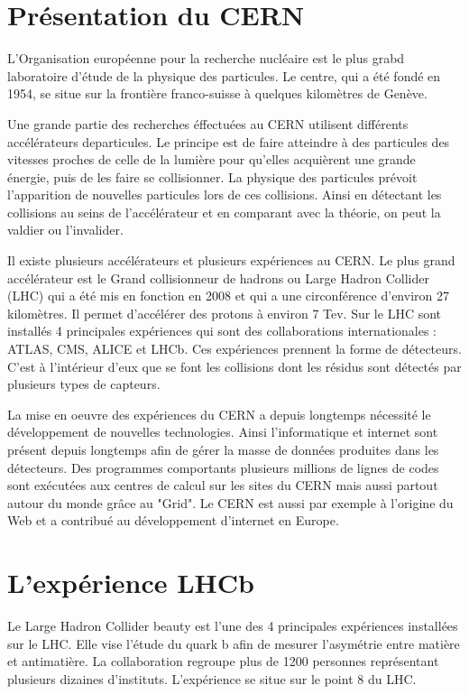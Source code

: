 \documentclass[a4paper,12pt]{report}
\begin{document}
    \section{Présentation du CERN}
    L'Organisation européenne pour la recherche nucléaire est le plus grabd laboratoire d'étude de la physique des particules.
    Le centre, qui a été fondé en 1954, se situe sur la frontière franco-suisse à quelques kilomètres de Genève.

    Une grande partie des recherches éffectuées au CERN utilisent différents accélérateurs departicules.
    Le principe est de faire atteindre à des particules des vitesses proches de celle de la lumière pour qu'elles acquièrent une grande énergie, puis de les faire se collisionner.
    La physique des particules prévoit l'apparition de nouvelles particules lors de ces collisions.
    Ainsi en détectant les collisions au seins de l'accélérateur et en comparant avec la théorie, on peut la valdier ou l'invalider.

    Il existe plusieurs accélérateurs et plusieurs expériences au CERN.
    Le plus grand accélérateur est le Grand collisionneur de hadrons ou Large Hadron Collider (LHC) qui a été mis en fonction en 2008 et qui a une circonférence d'environ 27 kilomètres.
    Il permet d'accélérer des protons à environ 7 Tev.
    Sur le LHC sont installés 4 principales expériences qui sont des collaborations internationales : ATLAS, CMS, ALICE et LHCb.
    Ces expériences prennent la forme de détecteurs. C'est à l'intérieur d'eux que se font les collisions dont les résidus sont détectés par plusieurs types de capteurs.

    La mise en oeuvre des expériences du CERN a depuis longtemps nécessité le développement de nouvelles technologies.
    Ainsi l'informatique et internet sont présent depuis longtemps afin de gérer la masse de données produites dans les détecteurs.
    Des programmes comportants plusieurs millions de lignes de codes sont exécutées aux centres de calcul sur les sites du CERN mais aussi partout autour du monde grâce au "Grid".
    Le CERN est aussi par exemple à l'origine du Web et a contribué au développement d'internet en Europe.

    \section{L'expérience LHCb}
    Le Large Hadron Collider beauty est l'une des 4 principales expériences installées sur le LHC.
    Elle vise l'étude du quark b afin de mesurer l'asymétrie entre matière et antimatière.
    La collaboration regroupe plus de 1200 personnes représentant plusieurs dizaines d'instituts.
    L'expérience se situe sur le point 8 du LHC.
\end{document}

